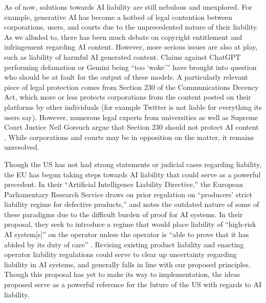 \documentclass[10pt]{article}
\begin{document}
    As of now, solutions towards AI liability are still nebulous and unexplored. For example, generative AI has become a hotbed of legal contention between corporations, users, and courts due to the unprecedented nature of their liability. As we alluded to, there has been much debate on copyright entitlement and infringement regarding AI content. However, more serious issues are also at play, such as liability of harmful AI generated content. Claims against ChatGPT performing defamation or Gemini being “too ‘woke’” have brought into question who should be at fault for the output of these models. A particularly relevant piece of legal protection comes from Section 230 of the Communications Decency Act, which more or less protects corporations from the content posted on their platforms by other individuals (for example Twitter is not liable for everything its users say). However, numerous legal experts from universities as well as Supreme Court Justice Neil Gorsuch argue that Section 230 should not protect AI content \cite{mims2024ai}. While corporations and courts may be in opposition on the matter, it remains unresolved.

    Though the US has not had strong statements or judicial cases regarding liability, the EU has begun taking steps towards AI liability that could serve as a powerful precedent. In their “Artificial Intelligence Liability Directive,” the European Parliamentary Research Service draws on prior regulation on “producers’ strict liability regime for defective products,” and notes the outdated nature of some of these paradigms due to the difficult burden of proof for AI systems. In their proposal, they seek to introduce a regime that would place liability of “high-risk AI system[s]” on the operator unless the operator is “able to prove that it has abided by its duty of care” \cite{ec2022artificial}. Revising existing product liability and enacting operator liability regulations could serve to clear up uncertainty regarding liability in AI systems, and generally falls in line with our proposed principles. Though this proposal has yet to make its way to implementation, the ideas proposed serve as a powerful reference for the future of the US with regards to AI liability.
\end{document}
